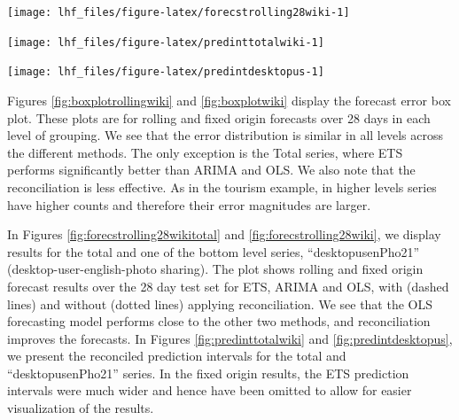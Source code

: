 \documentclass[11pt,a4paper,]{article}
\let\origfigure\figure
\let\endorigfigure\endfigure
\renewenvironment{figure}[1][2] {
    \expandafter\origfigure\expandafter[!htbp]
} {
    \endorigfigure
}
\begin{document}
\begin{figure}

{\centering \texttt{[image: lhf\_files/figure-latex/forecstrolling28wiki-1]} 

}

\caption{Comparing reconciled and unreconciled ETS, ARIMA and OLS rolling and fixed origin forecasts for Wikipedia pageviews 'desktopusenPho21' bottom-level series}\label{fig:forecstrolling28wiki}
\end{figure}

\begin{figure}

{\centering \texttt{[image: lhf\_files/figure-latex/predinttotalwiki-1]} 

}

\caption{The actual test set for the 'Total series' compared to the forecasts from reconciled and unreconciled OLS methods with prediction interval for rolling and fixed origin Wikipedia pageviews.}\label{fig:predinttotalwiki}
\end{figure}

\begin{figure}

{\centering \texttt{[image: lhf\_files/figure-latex/predintdesktopus-1]} 

}

\caption{The actual test set for the 'desktopusenPho21' bottom level series compared to the forecasts from reconciled and unreconciled OLS methods with prediction interval for rolling and fixed origin  Wikipedia pageviews.}\label{fig:predintdesktopus}
\end{figure}

Figures \ref{fig:boxplotrollingwiki} and \ref{fig:boxplotwiki} display the forecast error box plot. These plots are for rolling and fixed origin forecasts over 28 days in each level of grouping. We see that the error distribution is similar in all levels across the different methods. The only exception is the Total series, where ETS performs significantly better than ARIMA and OLS. We also note that the reconciliation is less effective. As in the tourism example, in higher levels series have higher counts and therefore their error magnitudes are larger.

In Figures \ref{fig:forecstrolling28wikitotal} and \ref{fig:forecstrolling28wiki}, we display results for the total and one of the bottom level series, ``desktopusenPho21'' (desktop-user-english-photo sharing). The plot shows rolling and fixed origin forecast results over the 28 day test set for ETS, ARIMA and OLS, with (dashed lines) and without (dotted lines) applying reconciliation. We see that the OLS forecasting model performs close to the other two methods, and reconciliation improves the forecasts. In Figures \ref{fig:predinttotalwiki} and \ref{fig:predintdesktopus}, we present the reconciled prediction intervals for the total and ``desktopusenPho21'' series. In the fixed origin results, the ETS prediction intervals were much wider and hence have been omitted to allow for easier visualization of the results.
\end{document}
